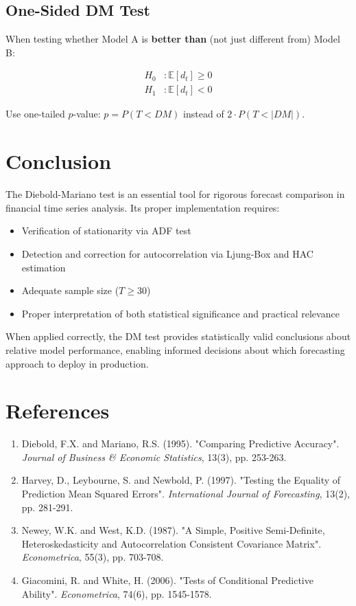 \documentclass[11pt,a4paper]{article}
\begin{document}
\subsection{One-Sided DM Test}

When testing whether Model A is \textbf{better than} (not just different from) Model B:

\begin{align}
H_0 &: \mathbb{E}[d_t] \geq 0 \\
H_1 &: \mathbb{E}[d_t] < 0
\end{align}

Use one-tailed $p$-value: $p = P(T < DM)$ instead of $2 \cdot P(T < |DM|)$.

\section{Conclusion}

The Diebold-Mariano test is an essential tool for rigorous forecast comparison in financial time series analysis. Its proper implementation requires:

\begin{itemize}
    \item Verification of stationarity via ADF test
    \item Detection and correction for autocorrelation via Ljung-Box and HAC estimation
    \item Adequate sample size ($T \geq 30$)
    \item Proper interpretation of both statistical significance and practical relevance
\end{itemize}

When applied correctly, the DM test provides statistically valid conclusions about relative model performance, enabling informed decisions about which forecasting approach to deploy in production.

\section*{References}

\begin{enumerate}
    \item Diebold, F.X. and Mariano, R.S. (1995). "Comparing Predictive Accuracy". \textit{Journal of Business \& Economic Statistics}, 13(3), pp. 253-263.
    
    \item Harvey, D., Leybourne, S. and Newbold, P. (1997). "Testing the Equality of Prediction Mean Squared Errors". \textit{International Journal of Forecasting}, 13(2), pp. 281-291.
    
    \item Newey, W.K. and West, K.D. (1987). "A Simple, Positive Semi-Definite, Heteroskedasticity and Autocorrelation Consistent Covariance Matrix". \textit{Econometrica}, 55(3), pp. 703-708.
    
    \item Giacomini, R. and White, H. (2006). "Tests of Conditional Predictive Ability". \textit{Econometrica}, 74(6), pp. 1545-1578.
\end{enumerate}
\end{document}
